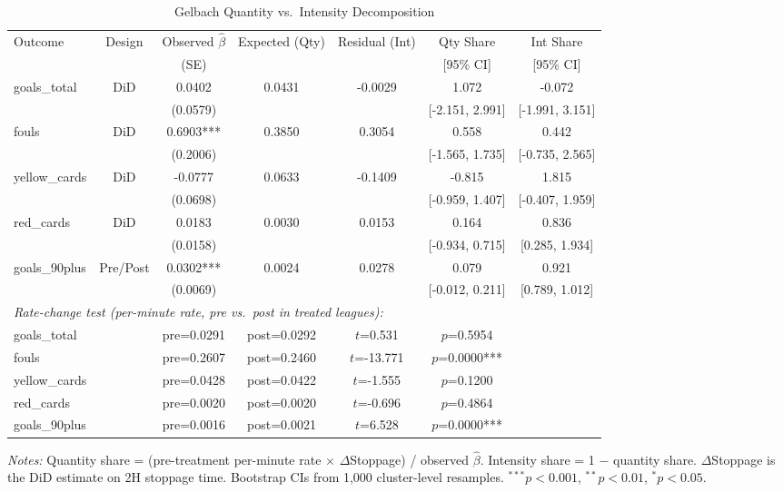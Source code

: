 \begin{table}[htbp]
\centering
\caption{Gelbach Quantity vs.\ Intensity Decomposition}
\label{tab:decomposition}
\begin{tabular}{lcccccc}
\toprule
Outcome & Design & Observed $\hat{\beta}$ & Expected (Qty) & Residual (Int) & Qty Share & Int Share \\
 & & (SE) & & & [95\% CI] & [95\% CI] \\
\midrule
goals\_total & DiD & 0.0402 & 0.0431 & -0.0029 & 1.072 & -0.072 \\
 & & (0.0579) & & & [-2.151, 2.991] & [-1.991, 3.151] \\[3pt]
fouls & DiD & 0.6903*** & 0.3850 & 0.3054 & 0.558 & 0.442 \\
 & & (0.2006) & & & [-1.565, 1.735] & [-0.735, 2.565] \\[3pt]
yellow\_cards & DiD & -0.0777 & 0.0633 & -0.1409 & -0.815 & 1.815 \\
 & & (0.0698) & & & [-0.959, 1.407] & [-0.407, 1.959] \\[3pt]
red\_cards & DiD & 0.0183 & 0.0030 & 0.0153 & 0.164 & 0.836 \\
 & & (0.0158) & & & [-0.934, 0.715] & [0.285, 1.934] \\[3pt]
goals\_90plus & Pre/Post & 0.0302*** & 0.0024 & 0.0278 & 0.079 & 0.921 \\
 & & (0.0069) & & & [-0.012, 0.211] & [0.789, 1.012] \\[3pt]
\midrule
\multicolumn{7}{l}{\textit{Rate-change test (per-minute rate, pre vs.\ post in treated leagues):}} \\[3pt]
goals\_total & & pre=0.0291 & post=0.0292 & $t$=0.531 & $p$=0.5954 & \\
fouls & & pre=0.2607 & post=0.2460 & $t$=-13.771 & $p$=0.0000*** & \\
yellow\_cards & & pre=0.0428 & post=0.0422 & $t$=-1.555 & $p$=0.1200 & \\
red\_cards & & pre=0.0020 & post=0.0020 & $t$=-0.696 & $p$=0.4864 & \\
goals\_90plus & & pre=0.0016 & post=0.0021 & $t$=6.528 & $p$=0.0000*** & \\
\bottomrule
\end{tabular}
\begin{tablenotes}
\small
\item \textit{Notes:} Quantity share = (pre-treatment per-minute rate $\times$ $\Delta$Stoppage) / observed $\hat{\beta}$.
 Intensity share = 1 $-$ quantity share.
 $\Delta$Stoppage is the DiD estimate on 2H stoppage time.
 Bootstrap CIs from 1,000 cluster-level resamples.
 $^{***}p<0.001$, $^{**}p<0.01$, $^{*}p<0.05$.
\end{tablenotes}
\end{table}